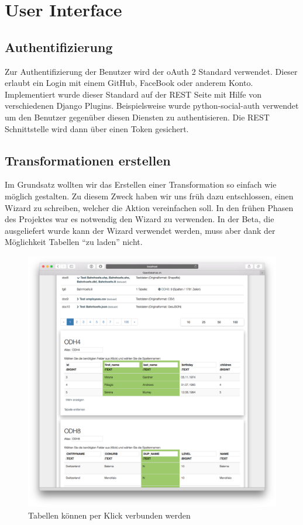 \section{User Interface}
\subsection{Authentifizierung}
Zur Authentifizierung der Benutzer wird der oAuth 2 Standard verwendet. Dieser erlaubt ein Login mit einem GitHub, FaceBook oder anderem Konto. Implementiert wurde dieser Standard auf der REST Seite mit Hilfe von verschiedenen Django Plugins. 
Beispielsweise wurde python-social-auth verwendet um den Benutzer gegenüber diesen Diensten zu authentisieren. Die REST Schnittstelle wird dann über einen Token gesichert.

\subsection{Transformationen erstellen}
Im Grundsatz wollten wir das Erstellen einer Transformation so einfach wie möglich gestalten. Zu diesem Zweck haben wir uns früh dazu entschlossen, einen Wizard zu schreiben, welcher die Aktion vereinfachen soll. In den frühen Phasen des Projektes war es notwendig den Wizard zu verwenden. In der Beta, die ausgeliefert wurde kann der Wizard verwendet werden, muss aber dank der Möglichkeit Tabellen ``zu laden'' nicht.
\begin{figure}[H]
\centering
\includegraphics[width=\linewidth]{fig/odhql_wizard_early.png}
\caption{Tabellen können per Klick verbunden werden }
\label{fig:pd:tables_per_click}
\end{figure}
